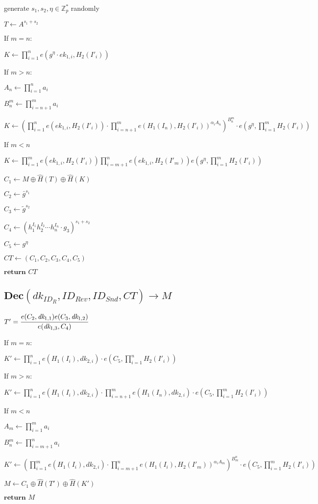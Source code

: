\documentclass[a4paper]{article}
\begin{document}
generate $s_1, s_2, \eta \in \mathbb{Z}_p^*$ randomly

$T \gets A^{s_1 + s_2}$

If $m = n$:

$K \gets \prod_{i = 1}^n e(g^{\eta} \cdot \textit{ek}_{1, i}, H_2(I'_i))$

If $m > n$:

$A_n \gets \prod\limits_{i = 1}^n a_i$

$B_n^m \gets \prod\limits_{i = n + 1}^m a_i$

$K \gets
(
\prod\limits_{i = 1}^n e(\textit{ek}_{1, i}, H_2(I'_i))
\cdot \prod\limits_{i = n + 1}^m e(H_1(I_n), H_2(I'_i))^{\alpha_i A_n}
)^{B_n^m}
\cdot e(g^{\eta}, \prod\limits_{i = 1}^m H_2(I'_i))
$

If $m < n$

$K \gets
\prod\limits_{i = 1}^m e(\textit{ek}_{1, i}, H_2(I'_i))
\prod\limits_{i = m + 1}^n e(\textit{ek}_{1, i}, H_2(I'_m))
e(g^{\eta}, \prod\limits_{i = 1}^m H_2(I'_i))
$

$C_1 \gets M \oplus \hat{H}(T) \oplus \hat{H}(K)$

$C_2 \gets \bar{g}^{s_1}$

$C_3 \gets \tilde{g}^{s_2}$

$C_4 \gets (h_1^{I_1} h_2^{I_2} \cdots h_n^{I_n} \cdot g_3)^{s_1 + s_2}$

$C_5 \gets g^{\eta}$

$\textit{CT} \gets (C_1, C_2, C_3, C_4, C_5)$

$\textbf{return }\textit{CT}$

\subsection{$\textbf{Dec}(\textit{dk}_{\textit{ID}_R}, \textit{ID}_\textit{Rev}, \textit{ID}_\textit{Snd}, \textit{CT}) \rightarrow M$}

$T' = \cfrac{e(C_2, \textit{dk}_{1, 1})e(C_3, \textit{dk}_{1, 2})}{e(\textit{dk}_{1, 3}, C_4)}$

If $m = n$:

$K' \gets
\prod\limits_{i = 1}^n e(H_1(I_i), \textit{dk}_{2, i})
\cdot e(C_5, \prod\limits_{i = 1}^n H_2(I'_i))
$

If $m > n$:

$K' \gets
\prod\limits_{i = 1}^n e(H_1(I_i), \textit{dk}_{2, i})
\cdot \prod\limits_{i = n + 1}^m e(H_1(I_n), \textit{dk}_{2, i})
\cdot e(C_5, \prod\limits_{i = 1}^m H_2(I'_i))
$

If $m < n$

$A_m \gets \prod\limits_{i = 1}^m a_i$

$B_n^m \gets \prod\limits_{i = m + 1}^n a_i$

$K' \gets
(
\prod\limits_{i = 1}^m e(H_1(I_i), \textit{dk}_{2, i})
\cdot \prod\limits_{i = m + 1}^n e(H_1(I_i), H_2(I'_m))^{\alpha_i A_m}
)^{B_m^n}
\cdot e(C_5, \prod\limits_{i = 1}^m H_2(I'_i))
$

$M \gets C_1 \oplus \hat{H}(T') \oplus \hat{H}(K')$

$\textbf{return }M$
\end{document}
